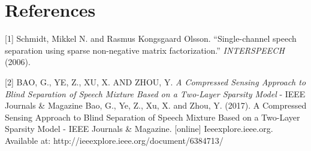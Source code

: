 \documentclass{article}
\begin{document}
\section*{References}

\medskip

\small

[1] Schmidt, Mikkel N. and Rasmus Kongsgaard Olsson. “Single-channel speech separation using sparse non-negative matrix factorization.” {\it INTERSPEECH} (2006).

[2] BAO, G., YE, Z., XU, X. AND ZHOU, Y.
{\it A Compressed Sensing Approach to Blind Separation of Speech Mixture Based on a Two-Layer Sparsity Model} - IEEE Journals \& Magazine Bao, G., Ye, Z., Xu, X. and Zhou, Y. (2017). A Compressed Sensing Approach to Blind Separation of Speech Mixture Based on a Two-Layer Sparsity Model - IEEE Journals \& Magazine. [online] Ieeexplore.ieee.org. Available at: http://ieeexplore.ieee.org/document/6384713/
\end{document}
